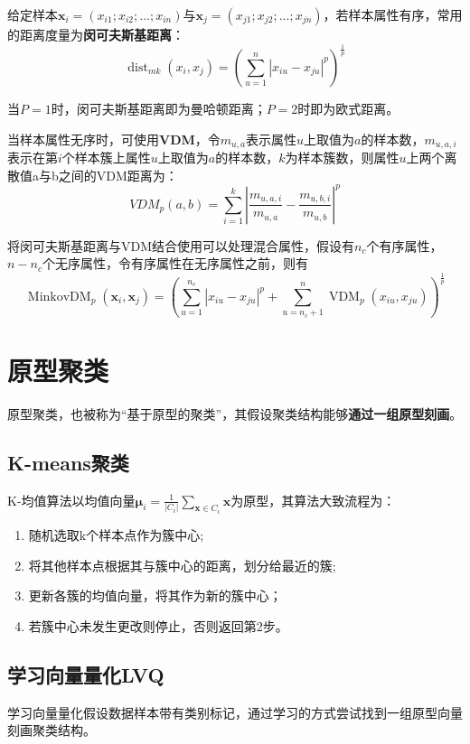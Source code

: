 给定样本$\boldsymbol x_i = (x_{i 1};x_{i 2};...;x_{in})$与$\boldsymbol x_j = (x_{j 1};x_{j 2};...;x_{jn})$，若样本属性有序，常用的距离度量为\textbf{闵可夫斯基距离}：\[
\operatorname{dist}_{m k}\left(x_{i}, x_{j}\right)=\left(\sum_{u=1}^{n}\left|x_{i u}-x_{j u}\right|^{p}\right)^{\frac{1}{p}}
\]

当$P=1$时，闵可夫斯基距离即为曼哈顿距离；$P=2$时即为欧式距离。

当样本属性无序时，可使用\textbf{VDM}，令$m_{u,a}$表示属性$u$上取值为$a$的样本数，$m_{u,a,i}$表示在第$i$个样本簇上属性$u$上取值为$a$的样本数，$k$为样本簇数，则属性$u$上两个离散值a与b之间的VDM距离为：
\[
V D M_{p}(a, b)=\sum_{i=1}^{k}\left|\frac{m_{u, a, i}}{m_{u, a}}-\frac{m_{u, b, i}}{m_{u, b}}\right|^{p}
\]

将闵可夫斯基距离与VDM结合使用可以处理混合属性，假设有$n_c$个有序属性，$n-n_c$个无序属性，令有序属性在无序属性之前，则有\[
\operatorname{MinkovDM}_{p}\left(\boldsymbol{x}_{i}, \boldsymbol{x}_{j}\right)=\left(\sum_{u=1}^{n_{c}}\left|x_{i u}-x_{j u}\right|^{p}+\sum_{u=n_{c}+1}^{n} \operatorname{VDM}_{p}\left(x_{i u}, x_{j u}\right)\right)^{\frac{1}{p}}
\]

\section{原型聚类}\label{sec:9.4}
原型聚类，也被称为“基于原型的聚类”，其假设聚类结构能够\textbf{通过一组原型刻画}。

\subsection{K-means聚类}\label{sec:9.4.1}
K-均值算法以均值向量$\boldsymbol \mu_i = \frac{1}{|C_i|}\sum_{\boldsymbol x\in C_i}\boldsymbol x$为原型，其算法大致流程为：
\begin{enumerate}
    \item 随机选取k个样本点作为簇中心;
    \item 将其他样本点根据其与簇中心的距离，划分给最近的簇;
    \item 更新各簇的均值向量，将其作为新的簇中心；
    \item 若簇中心未发生更改则停止，否则返回第2步。
\end{enumerate}

\subsection{学习向量量化LVQ}
学习向量量化假设数据样本带有类别标记，通过学习的方式尝试找到一组原型向量刻画聚类结构。

